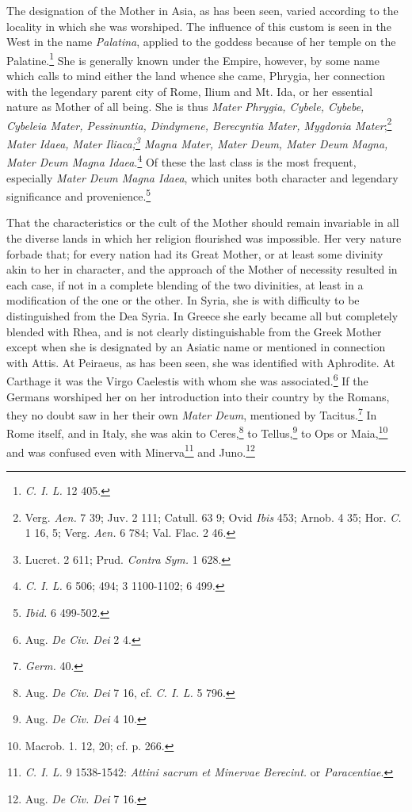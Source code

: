 \documentclass[a4paper, 11pt, oneside, polutonikogreek, french]{article}
\begin{document}
The designation of the Mother in Asia, as has been seen, varied according to the locality in which she was worshiped. The influence of this custom is seen in the West in the name \emph{Palatina}, applied to the goddess because of her temple on the Palatine.\footnote{\emph{C. I. L.} 12 405.} She is generally known under the Empire, however, by some name which calls to mind either the land whence she came, Phrygia, her connection with the legendary parent city of Rome, Ilium and Mt. Ida, or her essential nature as Mother of all being. She is thus \emph{Mater Phrygia, Cybele, Cybebe, Cybeleia Mater, Pessinuntia, Dindymene, Berecyntia Mater, Mygdonia Mater};\footnote{Verg. \emph{Aen.} 7 39; Juv. 2 111; Catull. 63 9; Ovid \emph{Ibis} 453; Arnob. 4 35; Hor. \emph{C.} 1 16, 5; Verg. \emph{Aen.} 6 784; Val. Flac. 2 46.} \emph{Mater Idaea, Mater Iliaca;\footnote{Lucret. 2 611; Prud. \emph{Contra Sym.} 1 628.} Magna Mater, Mater Deum, Mater Deum Magna, Mater Deum Magna Idaea}.\footnote{\emph{C. I. L.} 6 506; 494; 3 1100-1102; 6 499.} Of these the last class is the most frequent, especially \emph{Mater Deum Magna Idaea}, which unites both character and legendary significance and provenience.\footnote{\emph{Ibid.} 6 499-502.}

That the characteristics or the cult of the Mother should remain invariable in all the diverse lands in which her religion flourished was impossible. Her very nature forbade that; for every nation had its Great Mother, or at least some divinity akin to her in character, and the approach of the Mother of necessity resulted in each case, if not in a complete blending of the two divinities, at least in a modification of the one or the other. In Syria, she is with difficulty to be distinguished from the Dea Syria. In Greece she early became all but completely blended with Rhea, and is not clearly distinguishable from the Greek Mother except when she is designated by an Asiatic name or mentioned in connection with Attis. At Peiraeus, as has been seen, she was identified with Aphrodite. At Carthage it was the Virgo Caelestis with whom she was associated.\footnote{Aug. \emph{De Civ. Dei} 2 4.} If the Germans worshiped her on her introduction into their country by the Romans, they no doubt saw in her their own \emph{Mater Deum}, mentioned by Tacitus.\footnote{\emph{Germ.} 40.} In Rome itself, and in Italy, she was akin to Ceres,\footnote{Aug. \emph{De Civ. Dei} 7 16, cf. \emph{C. I. L.} 5 796.} to Tellus,\footnote{Aug. \emph{De Civ. Dei} 4 10.} to Ops or Maia,\footnote{Macrob. 1. 12, 20; cf. p. 266.} and was confused even with Minerva\footnote{\emph{C. I. L.} 9 1538-1542: \emph{Attini sacrum et Minervae Berecint.} or \emph{Paracentiae}.} and Juno.\footnote{Aug. \emph{De Civ. Dei} 7 16.}
\end{document}
